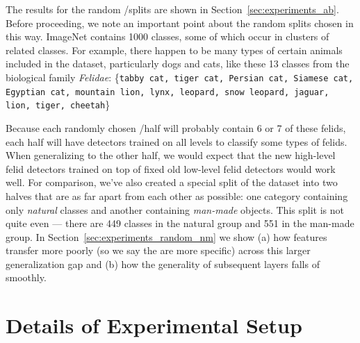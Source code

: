 The results for the random \dA/\dB splits are shown in Section~\ref{sec:experiments_ab}. Before proceeding, we note an important point about the random splits chosen in this way. ImageNet contains 1000 classes, some of which occur in clusters of related classes. For example, there happen to be many types of certain animals included in the dataset, particularly dogs and cats, like these 13 classes from the biological family \emph{Felidae}:
\{\texttt{tabby cat, tiger cat, Persian cat, Siamese cat, Egyptian cat, mountain lion, lynx, 
leopard, snow leopard, jaguar, lion, tiger, cheetah}\}


Because each randomly chosen \dA/\dB half will probably contain 6 or 7 of these felids, each half will have detectors trained on all levels to classify some types of felids. When generalizing to the other half, we would expect that the new high-level felid detectors trained on top of fixed old low-level felid detectors would work well.
For comparison, we've also created a special split of the dataset into two halves that are as far apart from each other as possible: one category containing only \emph{natural} classes and another containing \emph{man-made} objects. This split is not quite even --- there are 449 classes in the natural group and 551 in the man-made group. In Section~\ref{sec:experiments_random_nm} we show (a) how features transfer more poorly (so we say the are more specific) across this larger generalization gap and (b) how the generality of subsequent layers falls of smoothly.




\section{Details of Experimental Setup}
\label{sec:setup}

